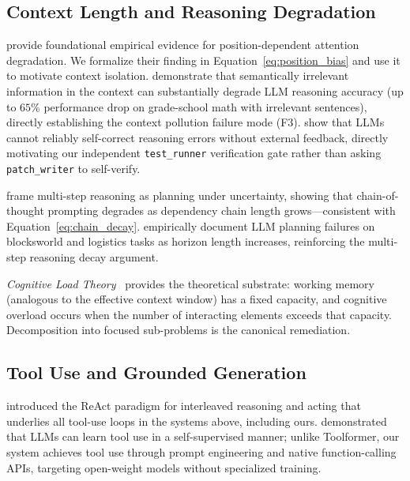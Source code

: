 \subsection{Context Length and Reasoning Degradation}

\citet{liu2023lostmiddle} provide foundational empirical evidence for
position-dependent attention degradation. We formalize their finding in
Equation~\eqref{eq:position_bias} and use it to motivate context isolation.
\citet{shi2023large} demonstrate that semantically irrelevant information
in the context can substantially degrade LLM reasoning accuracy (up to
$65\%$ performance drop on grade-school math with irrelevant sentences),
directly establishing the context pollution failure mode (F3).
\citet{huang2023self} show that LLMs cannot reliably self-correct reasoning
errors without external feedback, directly motivating our independent
\texttt{test\_runner} verification gate rather than asking
\texttt{patch\_writer} to self-verify.

\citet{hao2023reasoning} frame multi-step reasoning as planning under
uncertainty, showing that chain-of-thought prompting degrades as dependency
chain length grows---consistent with Equation~\eqref{eq:chain_decay}.
\citet{valmeekam2023planning} empirically document LLM planning failures on
blocksworld and logistics tasks as horizon length increases, reinforcing the
multi-step reasoning decay argument.

\emph{Cognitive Load Theory}~\cite{sweller1988cognitive,paas2003cognitive}
provides the theoretical substrate: working memory (analogous to the
effective context window) has a fixed capacity, and cognitive overload
occurs when the number of interacting elements exceeds that capacity.
Decomposition into focused sub-problems is the canonical remediation.

\subsection{Tool Use and Grounded Generation}

\citet{yao2023react} introduced the ReAct paradigm for interleaved
reasoning and acting that underlies all tool-use loops in the systems above,
including ours. \citet{schick2023toolformer} demonstrated that LLMs can
learn tool use in a self-supervised manner; unlike Toolformer, our system
achieves tool use through prompt engineering and native function-calling
APIs, targeting open-weight models without specialized training.

